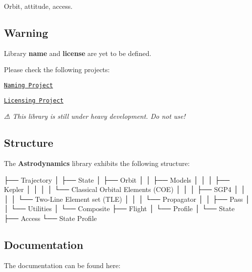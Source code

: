 Orbit, attitude, access.

\href{https://travis-ci.com/open-space-collective/library-astrodynamics}{\tt } \href{https://codecov.io/gh/open-space-collective/library-astrodynamics}{\tt } \href{https://open-space-collective.github.io/library-astrodynamics}{\tt } \href{https://badge.fury.io/gh/open-space-collective%2Flibrary-astrodynamics}{\tt } \href{https://badge.fury.io/py/LibraryAstrodynamicsPy}{\tt }



\subsection*{Warning}

Library {\bfseries name} and {\bfseries license} are yet to be defined.

Please check the following projects\+:


\begin{DoxyItemize}
\item \href{https://github.com/orgs/open-space-collective/projects/1}{\tt Naming Project}
\item \href{https://github.com/orgs/open-space-collective/projects/2}{\tt Licensing Project}
\end{DoxyItemize}

{\itshape ⚠ This library is still under heavy development. Do not use!}

\subsection*{Structure}

The {\bfseries Astrodynamics} library exhibits the following structure\+:


\begin{DoxyCode}
├── Trajectory
│   ├── State
│   ├── Orbit
│   │   ├── Models
│   │   │   ├── Kepler
│   │   │   │   └── Classical Orbital Elements (COE)
│   │   │   ├── SGP4
│   │   │   │   └── Two-Line Element \textcolor{keyword}{set} (TLE)
│   │   │   └── Propagator
│   │   ├── Pass
│   │   └── Utilities
│   └── Composite
├── Flight
│   └── Profile
│       └── State
├── Access
└── State Profile
\end{DoxyCode}


\subsection*{Documentation}

The documentation can be found here\+:


